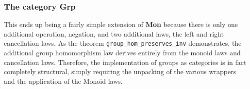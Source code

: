 \documentclass[12pt,twocolumn,oneside]{book}
\begin{document}
\subsubsection{The category \textbf{Grp}}

This ends up being a fairly simple extension of \textbf{Mon} because there is only
one additional operation, negation, and two additional laws, the left and right
cancellation laws. As the theorem \texttt{group\_hom\_preserves\_inv} demonstrates,
the additional group homomorphism law derives entirely from the monoid laws and
cancellation laws. Therefore, the implementation of groups as categories is in
fact completely structural, simply requiring the unpacking of the various wrappers
and the application of the Monoid laws.
\end{document}
